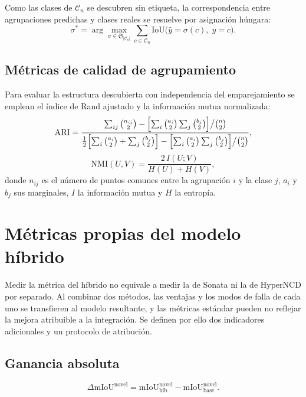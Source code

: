 Como las clases de $\mathcal{C}_n$ se descubren sin etiqueta, la correspondencia
entre agrupaciones predichas y clases reales se resuelve por asignación húngara:
\begin{equation}
\sigma^{*}=\arg\max_{\sigma\in\mathfrak{S}_{|\mathcal{C}_n|}}
\sum_{c\in\mathcal{C}_n}\mathrm{IoU}\bigl(\hat{y}=\sigma(c),\;y=c\bigr).
\label{eq:hungaro}
\end{equation}

\subsection{Métricas de calidad de agrupamiento}

Para evaluar la estructura descubierta con independencia del emparejamiento se
emplean el índice de Rand ajustado y la información mutua normalizada:
\begin{equation}
\mathrm{ARI}=
\frac{\sum_{ij}\binom{n_{ij}}{2}
-\Bigl[\sum_i\binom{a_i}{2}\sum_j\binom{b_j}{2}\Bigr]\big/\binom{n}{2}}
{\tfrac{1}{2}\Bigl[\sum_i\binom{a_i}{2}+\sum_j\binom{b_j}{2}\Bigr]
-\Bigl[\sum_i\binom{a_i}{2}\sum_j\binom{b_j}{2}\Bigr]\big/\binom{n}{2}},
\label{eq:ari}
\end{equation}
\begin{equation}
\mathrm{NMI}(U,V)=\frac{2\,I(U;V)}{H(U)+H(V)},
\label{eq:nmi}
\end{equation}
donde $n_{ij}$ es el número de puntos comunes entre la agrupación $i$ y la clase
$j$, $a_i$ y $b_j$ sus marginales, $I$ la información mutua y $H$ la entropía.

\section{Métricas propias del modelo híbrido}
\label{sec:metricas-hibrido}

Medir la métrica del híbrido no equivale a medir la de Sonata ni la de HyperNCD
por separado. Al combinar dos métodos, las ventajas y los modos de falla de cada
uno se transfieren al modelo resultante, y las métricas estándar pueden no
reflejar la mejora atribuible a la integración. Se definen por ello dos
indicadores adicionales y un protocolo de atribución.

\subsection{Ganancia absoluta}

\begin{equation}
\Delta\mathrm{mIoU}^{\mathrm{novel}}=
\mathrm{mIoU}^{\mathrm{novel}}_{\mathrm{hib}}-\mathrm{mIoU}^{\mathrm{novel}}_{\mathrm{base}}.
\label{eq:delta}
\end{equation}

